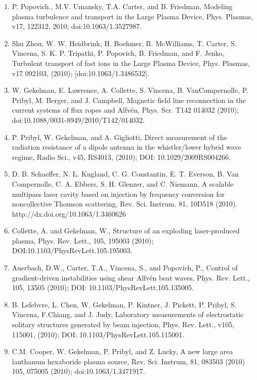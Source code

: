 \documentclass[11pt]{article}
\begin{document}
\begin{enumerate}
\item   P. Popovich., M.V. Umansky, T.A. Carter, and B. Friedman, Modeling plasma turbulence and transport in the Large Plasma Device, Phys. Plasmas, v17, 122312, 2010; doi:10.1063/1.3527987.

\item Shu Zhou, W. W. Heidbrink, H. Boehmer, R. McWilliams, T. Carter, S. Vincena, S. K. P. Tripathi, P. Popovich, B. Friedman, and F. Jenko, Turbulent transport of fast ions in the Large Plasma Device, Phys. Plasmas, v17 092103, (2010); [doi:10.1063/1.3486532].

\item  W. Gekelman, E. Lawrence, A. Collette, S. Vincena, B. VanCompernolle, P. Pribyl, M. Berger, and J. Campbell, Magnetic field line reconnection in the current systems of flux ropes and Alfv\'{e}n, Phys. Scr. T142 014032 (2010); doi:10.1088/0031-8949/2010/T142/014032.

\item  P. Pribyl, W. Gekelman, and A. Gigliotti, Direct measurement of the radiation resistance of a dipole antenna in the whistler/lower hybrid wave regime, Radio Sci., v45, RS4013, (2010); DOI: 10.1029/2009RS004266.

\item  D. B. Schaeffer, N. L. Kugland, C. G. Constantin, E. T. Everson, B. Van Compernolle, C. A. Ebbers, S. H. Glenzer, and C. Niemann, A scalable multipass laser cavity based on injection by frequency conversion for noncollective Thomson scattering, Rev. Sci. Instrum. 81, 10D518 (2010).  http://dx.doi.org/10.1063/1.3460626

\item  Collette, A. and Gekelman, W., Structure of an exploding laser-produced plasma, Phys. Rev. Lett., 105, 195003 (2010); DOI:10.1103/PhysRevLett.105.195003.

\item  Auerbach, D.W., Carter, T.A., Vincena, S., and Popovich, P., Control of gradient-driven instabilities using shear Alfv\'{e}n beat waves, Phys. Rev. Lett., 105, 13505 (2010); DOI: 10.1103/PhysRevLett.105.135005.

\item  B. Lefebvre, L. Chen, W. Gekelman, P. Kintner, J. Pickett, P. Pribyl, S. Vincena, F.Chiang, and J. Judy, Laboratory measurements of electrostatic solitary structures generated by beam injection, Phys. Rev. Lett., v105, 115001, (2010); DOI: 10.1103/PhysRevLett.105.115001.

\item  C.M. Cooper, W. Gekelman, P. Pribyl, and Z. Lucky, A new large area lanthanum hexaboride plasma source, Rev. Sci. Instrum, 81, 083503 (2010) 105, 075005 (2010); doi:10.1063/1.3471917.


\end{enumerate}
\end{document}

